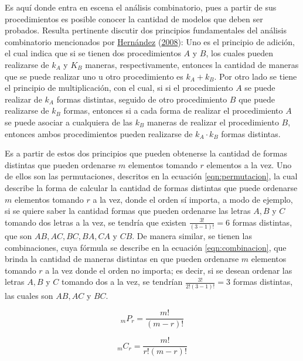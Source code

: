 \documentclass[
]{article}
\begin{document}
Es aquí donde entra en escena el análisis combinatorio, pues a partir de
sus procedimientos es posible conocer la cantidad de modelos que deben
ser probados. Resulta pertinente discutir dos principios fundamentales
del análisis combinatorio mencionados por
\protect\hyperlink{ref-analisis_combinatorio}{Hernández}
(\protect\hyperlink{ref-analisis_combinatorio}{2008}): Uno es el
principio de adición, el cual indica que si se tienen dos procedimientos
\(A\) y \(B\), los cuales pueden realizarse de \(k_A\) y \(K_B\)
maneras, respectivamente, entonces la cantidad de maneras que se puede
realizar uno u otro procedimiento es \(k_A + k_B\). Por otro lado se
tiene el principio de multiplicación, con el cual, si si el
procedimiento \(A\) se puede realizar de \(k_A\) formas distintas,
seguido de otro procedimiento \(B\) que puede realizarse de \(k_B\)
formas, entonces si a cada forma de realizar el procedimiento \(A\) se
puede asociar a cualquiera de las \(k_B\) maneras de realizar el
procedimiento \(B\), entonces ambos procedimientos pueden realizarse de
\(k_A \cdot k_B\) formas distintas.

Es a partir de estos dos principios que pueden obtenerse la cantidad de
formas distintas que pueden ordenarse \(m\) elementos tomando \(r\)
elementos a la vez. Uno de ellos son las permutaciones, descritos en la
ecuación \ref{eqn:permutacion}, la cual describe la forma de calcular la
cantidad de formas distintas que puede ordenarse \(m\) elementos tomando
\(r\) a la vez, donde el orden sí importa, a modo de ejemplo, si se
quiere saber la cantidad formas que pueden ordenarse las letras \(A, B\)
y \(C\) tomando dos letras a la vez, se tendría que existen
\(\frac{3!}{(3-1)!}=6\) formas distintas, que son \(AB, AC, BC, BA, CA\)
y \(CB\). De manera similar, se tienen las combinaciones, cuya fórmula
se describe en la ecuación \ref{eqn:combinacion}, que brinda la cantidad
de maneras distintas en que pueden ordenarse \(m\) elementos tomando
\(r\) a la vez donde el orden no importa; es decir, si se desean ordenar
las letras \(A, B\) y \(C\) tomando dos a la vez, se tendrían
\(\frac{3!}{2!(3-1)!}=3\) formas distintas, las cuales son \(AB, AC\) y
\(BC\).

\begin{equation}
\label{eqn:permutacion}
_mP_r=\frac{m!}{(m-r)!}
\end{equation}

\begin{equation}
\label{eqn:combinacion}
_mC_r=\frac{m!}{r!(m-r)!}
\end{equation}
\end{document}
